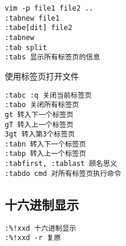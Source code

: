 \begin{verbatim}
vim -p file1 file2 ..
:tabnew file1
:tabe[dit] file2
:tabnew
:tab split
:tabs 显示所有标签页的信息
\end{verbatim}
使用标签页打开文件

\begin{verbatim}
:tabc :q 关闭当前标签页
:tabo 关闭所有标签页
gt 转入下一个标签页
gT 转入上一个标签页
3gt 转入第3个标签页
:tabn 转入下一个标签页
:tabp 转入上一个标签页
:tabfirst, :tablast 顾名思义
:tabdo cmd 对所有标签页执行命令
\end{verbatim}

\subsection{十六进制显示}
\begin{verbatim}
:%!xxd 十六进制显示
:%!xxd -r 复原
\end{verbatim}



